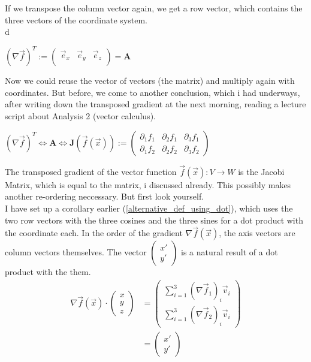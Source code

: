 \documentclass[a4paper]{article}
\begin{document}
\begin{Example}
If we transpose the column vector again, we get a row vector, which contains the three vectors of the coordinate system.\\d

\begin{center}
$(\nabla\vec{f})^{T} := \begin{pmatrix}\vec{e}_{x} & \vec{e}_{y} &\vec{e}_{z}\\\end{pmatrix} = \boldsymbol{A} $
\end{center}

Now we could reuse the vector of vectors (the matrix) and multiply again with coordinates. But before, we come to another conclusion, which i had underways, after writing down the transposed gradient at the next morning, reading a lecture script about Analysis 2 (vector calculus).\\

\begin{center}
$(\nabla\vec{f})^{T} \Leftrightarrow  \boldsymbol{A}  \Leftrightarrow \boldsymbol{J}(\vec{f}(\vec{x})) := \begin{pmatrix}\partial_{1}f_{1} & \partial_{2}f_{1} & \partial_{3}f_{1}\\\partial_{1}f_{2} & \partial_{2}f_{2} & \partial_{3}f_{2}\end{pmatrix}$
\end{center}

The transposed gradient of the vector function $\vec{f}(\vec{x}) : V \rightarrow W$ is the Jacobi Matrix, which is equal to the matrix, i discussed already. This possibly makes another re-ordering neccessary. But first look yourself.\\

I have set up a corollary earlier (\ref{alternative_def_using_dot}), which uses the two row vectors with the three cosines and the three sines for a dot product with the coordinate each. In the order of the gradient $\nabla\vec{f}(\vec{x})$, the axis vectors are column vectors themselves. The vector $\begin{pmatrix}x'\\y'\end{pmatrix}$ is a natural result of a dot product with the them.\\

\begin{displaymath}
\begin{align}
\nabla\vec{f}(\vec{x}) \cdot \begin{pmatrix}x\\y\\z\end{pmatrix} &= \begin{pmatrix}\sum_{i=1}^{3}(\nabla\vec{f}_{1})_{i}\vec{v}_{i}\\\sum_{i=1}^{3}(\nabla\vec{f}_{2})_{i}\vec{v}_{i}\end{pmatrix}\\ &= \begin{pmatrix}x'\\y'\end{pmatrix}
\end{align}
\end{displaymath}


\end{Example}
\end{document}
